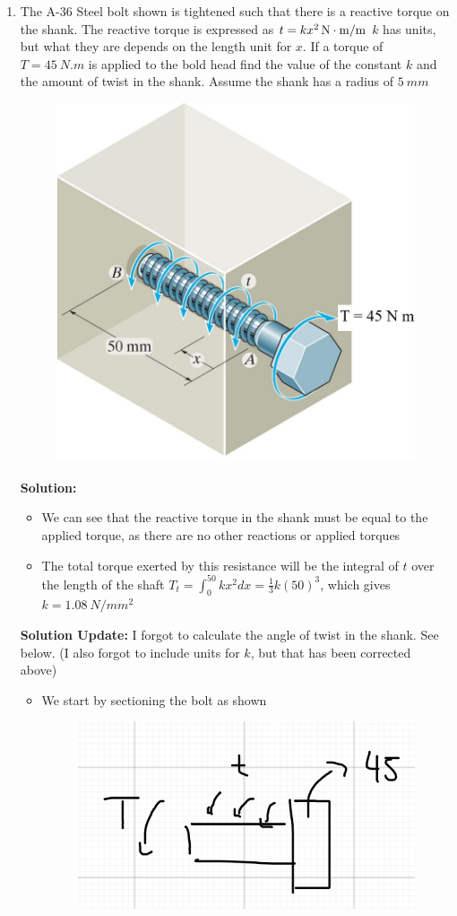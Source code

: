 \documentclass[12pt, oneside]{article}
\begin{document}
\begin{enumerate}
	\item %
		The A-36 Steel bolt shown is tightened such that there is a reactive torque on the shank.
		The reactive torque is expressed as $t = \SI[number-math-rm = \mathnormal, parse-numbers = false]{kx^2 }{N.m/m}$ $k$ has units, but what they are depends on the length unit for $x$.
		If a torque of $T=\SI{45 }{N.m}$ is applied to the bold head find the value of the constant $k$ and the amount of twist in the shank.
		Assume the shank has a radius of $\SI{5 }{mm}$
		\begin{figure}[H]
			\centering
			\includegraphics[width=0.6\linewidth]{5-69}
		\end{figure}
		\textbf{Solution:}
		\begin{itemize}
			\item We can see that the reactive torque in the shank must be equal to the applied torque, as there are no other reactions or applied torques
      \item The total torque exerted by this resistance will be the integral of $t$ over the length of the shaft $T_t = \int_0^{50} kx^2 dx = \frac{1}{3}k (50)^3$, which gives $k = \SI{1.08}{N/mm^2}$
		\end{itemize}
    \textbf{Solution Update:} I forgot to calculate the angle of twist in the shank. See below. (I also forgot to include units for $k$, but that has been corrected above)
		\begin{itemize}
			\item We start by sectioning the bolt as shown
				\begin{figure}[H]
					\centering
					\includegraphics[width=0.6\linewidth]{4-4}

\end{figure}
\end{itemize}
\end{enumerate}
\end{document}
